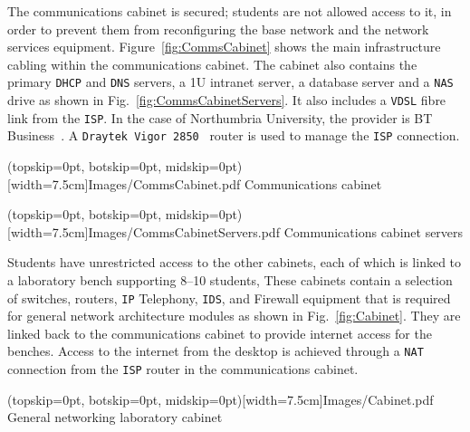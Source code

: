 \documentclass{ieeeaccess}
\begin{document}
The communications cabinet is secured; students are not allowed access to it,
in order to prevent them from reconfiguring the base network and the network
services equipment. Figure~\ref{fig:CommsCabinet} shows the main infrastructure
cabling within the communications cabinet.  The cabinet also contains the
primary \texttt{DHCP} and \texttt{DNS} servers, a 1U intranet server, a
database server and a \texttt{NAS} drive as shown in
Fig.~\ref{fig:CommsCabinetServers}. It also includes a \texttt{VDSL} fibre link
from the \texttt{ISP}. In the case of Northumbria University, the provider is
BT Business~\cite{BT:17}. A \texttt{Draytek Vigor 2850}~\cite{DC:17} router is
used to manage the \texttt{ISP} connection. 

\Figure[t!](topskip=0pt, botskip=0pt, midskip=0pt)[width=7.5cm]{Images/CommsCabinet.pdf}
{Communications cabinet\label{fig:CommsCabinet}}

\Figure[t!](topskip=0pt, botskip=0pt, midskip=0pt)[width=7.5cm]{Images/CommsCabinetServers.pdf}
{Communications cabinet servers\label{fig:CommsCabinetServers}}


Students have unrestricted access to the other cabinets, each of which is
linked to a laboratory bench supporting 8--10 students, These cabinets contain
a selection of switches, routers, \texttt{IP} Telephony, \texttt{IDS}, and
Firewall equipment that is required for general network architecture modules as
shown in Fig.~\ref{fig:Cabinet}.  They are linked back to the communications
cabinet to provide internet access for the benches. Access to the internet from
the desktop is achieved through a \texttt{NAT} connection from the \texttt{ISP}
router in the communications cabinet. 

\Figure[t!](topskip=0pt, botskip=0pt, midskip=0pt)[width=7.5cm]{Images/Cabinet.pdf}
{General networking laboratory cabinet\label{fig:Cabinet}}
\end{document}
